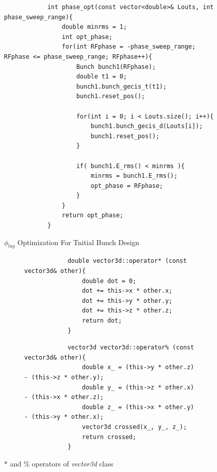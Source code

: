\documentclass[a4paper,oneside,12pt]{report}
\numberwithin{equation}{chapter}
\begin{document}
\begin{figure}[H]
        \centering
        \captionsetup{justification=centering}
        \begin{verbatim}
            int phase_opt(const vector<double>& Louts, int phase_sweep_range){
                double minrms = 1;
                int opt_phase;
                for(int RFphase = -phase_sweep_range; RFphase <= phase_sweep_range; RFphase++){
                    Bunch bunch1(RFphase);
                    double t1 = 0;
                    bunch1.bunch_gecis_t(t1);
                    bunch1.reset_pos();
            
                    for(int i = 0; i < Louts.size(); i++){
                        bunch1.bunch_gecis_d(Louts[i]);
                        bunch1.reset_pos();
                    }
                        
                    if( bunch1.E_rms() < minrms ){
                        minrms = bunch1.E_rms();
                        opt_phase = RFphase;
                    }
                }
                return opt_phase;
            }
        \end{verbatim}
    \caption{$\phi_{lag}$ Optimization For Tnitial Bunch Design}
    \label{fig:phlag_opt_n_pass}
\end{figure}

\begin{figure}[H]
    \captionsetup[subfigure]{justification=centering}
    \captionsetup{justification=centering}
    \begin{subfigure}{\textwidth}
        \begin{verbatim}
            double vector3d::operator* (const vector3d& other){
                double dot = 0;
                dot += this->x * other.x;
                dot += this->y * other.y;
                dot += this->z * other.z;
                return dot;
            }
        \end{verbatim}
    \end{subfigure}

    \begin{subfigure}{\textwidth}
        \begin{verbatim}
            vector3d vector3d::operator% (const vector3d& other){
                double x_ = (this->y * other.z) - (this->z * other.y);
                double y_ = (this->z * other.x) - (this->x * other.z);
                double z_ = (this->x * other.y) - (this->y * other.x);
                vector3d crossed(x_, y_, z_);
                return crossed;
            }
        \end{verbatim}
    \end{subfigure}
    \caption{* and \% operators of \textit{vector3d} class}
    \label{fig:vector3d_dot_cross_product}
\end{figure}
\end{document}
